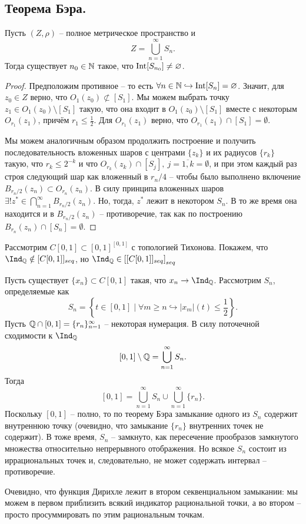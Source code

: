 \subsection{Теорема Бэра.}
\begin{theorem}[Бэр]
    Пусть $(Z, \rho)$ -- полное метрическое пространство и
    \[
        Z = \bigcup_{n = 1}^{\infty} S_n.
    \]
    Тогда существует $n_0 \in \mathbb{N}$ такое, что $\operatorname{Int} [S_{n_0}] \neq \varnothing$.
\end{theorem}
\begin{proof}
    Предположим противное -- то есть $\forall n \in \mathbb{N} \hookrightarrow \operatorname{Int} [S_n] = \varnothing$.
    Значит, для $z_0 \in Z$ верно, что $O_1(z_0) \not\subset [S_1]$.
    Мы можем выбрать точку $z_1 \in O_1(z_0) \setminus [S_1]$ такую, что она входит в $O_1(z_0) \setminus [S_1]$ вместе с некоторым $O_{r_1}(z_1)$, причём $r_1 \leq \frac{1}{2}$.
    Для $O_{r_1}(z_1)$ верно, что $O_{r_1}(z_1) \cap [S_1] = \emptyset$.

    Мы можем аналогичным образом продолжить построение и получить последовательность вложенных шаров с центрами $\{z_k\}$ и их радиусов $\{r_k\}$ такую, что $r_k \leq 2^{-k}$ и что $O_{r_k}(z_k) \cap [S_j], \ j = \overline{1, k} = \emptyset$, и при этом каждый раз строя следующий шар как вложенный в $r_n/4$ -- чтобы было выполнено включение $B_{r_n/2}(z_n) \subset O_{r_n}(z_n)$.
    В силу принципа вложенных шаров $\exists! z^* \in \bigcap_{n = 1}^{\infty} B_{r_n/2}(z_n)$.
    Но, тогда, $z^*$ лежит в некотором $S_n$.
    В то же время она находится и в $B_{r_n/2}(z_n)$ -- противоречие, так как по построению $B_{r_n}(z_n) \cap [S_n] = \emptyset$.
\end{proof}
\begin{example}
    Рассмотрим $C[0, 1] \subset [0, 1]^{[0, 1]}$ с топологией Тихонова.
    Покажем, что $\Ind_{\Q} \notin [C[0, 1]]_{seq}$, но $\Ind_{\Q} \in \left[[C[0, 1]]_{seq}\right]_{seq}$

    Пусть существует $\{x_n\} \subset C[0, 1]$ такая, что $x_n \rightarrow \Ind_{\Q}$.
    Рассмотрим $S_n$, определяемые как
    \[
        S_n = \left\{t \in [0, 1] \mid \forall m \geq n \hookrightarrow |x_m|(t) \leq \frac{1}{2}\right\}.
    \]
    Пусть $\mathbb{Q} \cap [0, 1] = \{r_n\}_{n = 1}^{\infty}$ -- некоторая нумерация.
    В силу поточечной сходимости к $\Ind_{\Q}$
    \[
        [0, 1] \setminus \mathbb{Q} = \bigcup_{n = 1}^{\infty} S_n.
    \]
    Тогда
    \[
        [0, 1] = \bigcup_{n = 1}^{\infty} S_n \cup \bigcup_{n = 1}^{\infty} \{r_n\}.
    \]
    Поскольку $[0, 1]$ -- полно, то по теорему Бэра замыкание одного из $S_n$ содержит внутреннюю точку (очевидно, что замыкание $\{r_n\}$ внутренних точек не содержит).
    В тоже время, $S_n$ -- замкнуто, как пересечение прообразов замкнутого множества относительно непрерывного отображения.
    Но всякое $S_n$ состоит из иррациональных точек и, следовательно, не может содержать интервал -- противоречие.

    Очевидно, что функция Дирихле лежит в втором секвенциальном замыкании: мы можем в первом приблизить всякий индикатор рациональной точки, а во втором -- просто просуммировать по этим рациональным точкам.
\end{example}

